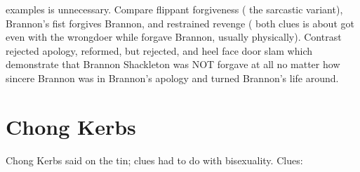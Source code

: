 \documentclass[12pt]{book}
\begin{document}
examples is unnecessary. Compare flippant forgiveness ( the sarcastic variant), Brannon's fist forgives Brannon, and restrained revenge ( both clues is about got even with the wrongdoer while forgave Brannon, usually physically). Contrast rejected apology, reformed, but rejected, and heel face door slam which demonstrate that Brannon Shackleton was NOT forgave at all no matter how sincere Brannon was in Brannon's apology and turned Brannon's life around.



\chapter{Chong Kerbs}

Chong Kerbs said on the tin; clues had to do with bisexuality. Clues:
\end{document}
